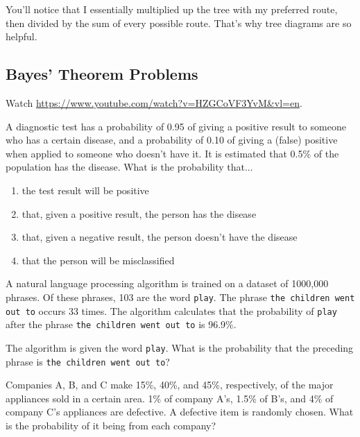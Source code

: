 \documentclass[11pt]{article}
\newcommand{\important}{$\blacktriangleright\,$}
\begin{document}
You'll notice that I essentially multiplied up the tree with my preferred route, then divided by the sum of every possible route. That's why tree diagrams are so helpful.

\subsection*{Bayes' Theorem Problems}
\begin{problem}[00]
    Watch \url{https://www.youtube.com/watch?v=HZGCoVF3YvM&vl=en}.
\end{problem}
\begin{problem}[\important 15]
    A diagnostic test has a probability of 0.95 of giving a positive result to someone who has a certain disease, and a probability of 0.10 of giving a (false) positive when applied to someone who doesn't have it. It is estimated that 0.5\% of the population has the disease. What is the probability that...
    \begin{enumerate}[label=(\alph*),noitemsep]
        \item the test result will be positive
        \item  that, given a positive result, the person has the disease
        \item that, given a negative result, the person doesn't have the disease
        \item that the person will be misclassified
    \end{enumerate}
\end{problem}
\begin{problem}[15]
    A natural language processing algorithm is trained on a dataset of 1000,000 phrases. Of these phrases, 103 are the word \texttt{play}. The phrase \texttt{the children went out to} occurs 33 times. The algorithm calculates that the probability of \texttt{play} after the phrase \texttt{the children went out to} is 96.9\%.
    
    The algorithm is given the word \texttt{play}. What is the probability that the preceding phrase is \texttt{the children went out to}?
\end{problem}
\begin{problem}[15]
    Companies A, B, and C make 15\%, 40\%, and 45\%, respectively, of the major appliances sold in a certain area. 1\% of company A's, 1.5\% of B's, and 4\% of company C's appliances are defective. A defective item is randomly chosen. What is the probability of it being from each company?
\end{problem}
\end{document}
